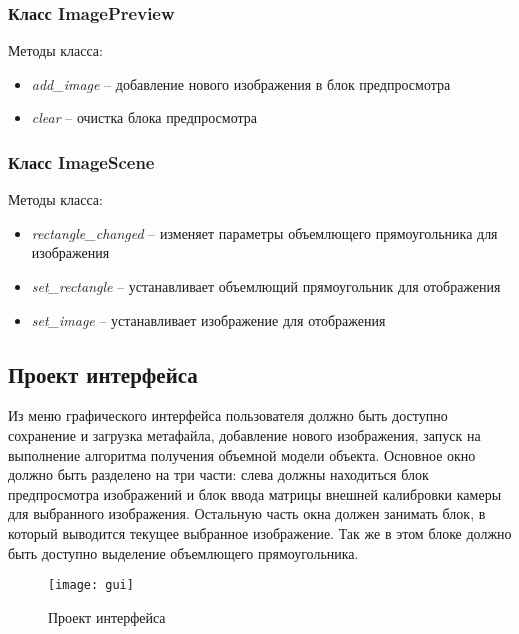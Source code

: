 \subsubsection{Класс ImagePreview}
Методы класса:
\begin{itemize}
\item \textit{add\_image} -- добавление нового изображения в блок предпросмотра
\item \textit{clear} -- очистка блока предпросмотра
\end{itemize}

\subsubsection{Класс ImageScene}
Методы класса:
\begin{itemize}
\item \textit{rectangle\_changed} -- изменяет параметры объемлющего прямоугольника для изображения
\item \textit{set\_rectangle} -- устанавливает объемлющий прямоугольник для отображения
\item \textit{set\_image} -- устанавливает изображение для отображения
\end{itemize}

\subsection{Проект интерфейса}
Из меню графического интерфейса пользователя должно быть доступно сохранение и загрузка метафайла, добавление нового изображения, запуск на выполнение алгоритма получения объемной модели объекта. Основное окно должно быть разделено на три части: слева должны находиться блок предпросмотра изображений и блок ввода матрицы внешней калибровки камеры для выбранного изображения. Остальную часть окна должен занимать блок, в который выводится текущее выбранное изображение. Так же в этом блоке должно быть доступно выделение объемлющего прямоугольника.
\renewcommand{\figurename}{Рис.}
\begin{figure}[h]
\center
\texttt{[image: gui]}
\caption{Проект интерфейса}
\end{figure}

